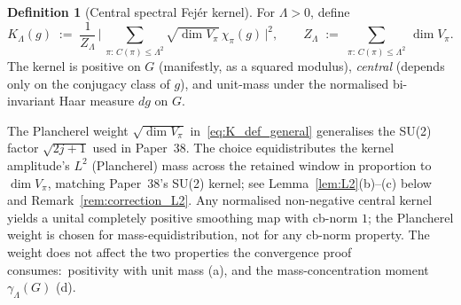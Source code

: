 \documentclass[11pt,a4paper]{article}
\theoremstyle{plain}
\theoremstyle{definition}
\newtheorem{definition}[theorem]{Definition}
\newcommand{\Lammax}{\Lambda}
\newcommand{\Cas}{C}
\newcommand{\KS}{K}
\begin{document}
\begin{definition}[Central spectral Fej\'er kernel]\label{def:central_fejer_general}
For $\Lammax > 0$, define
\begin{equation}\label{eq:K_def_general}
   \KS_\Lammax(g)
   \;:=\; \frac{1}{Z_\Lammax}\,
   \biggl|\,\sum_{\pi:\, \Cas(\pi) \le \Lammax^2}
   \sqrt{\dim V_\pi}\, \chi_\pi(g)\,\biggr|^{2},
   \qquad
   Z_\Lammax \;:=\; \sum_{\pi:\, \Cas(\pi) \le \Lammax^2}\,\dim V_\pi.
\end{equation}
The kernel is positive on $G$ (manifestly, as a squared modulus),
\emph{central} (depends only on the conjugacy class of $g$), and
unit-mass under the normalised bi-invariant Haar measure $dg$ on $G$.
\end{definition}

The Plancherel weight $\sqrt{\dim V_\pi}$ in~\eqref{eq:K_def_general}
generalises the SU(2) factor $\sqrt{2j+1}$ used in Paper~38. The
choice equidistributes the kernel amplitude's $L^2$ (Plancherel) mass
across the retained window in proportion to $\dim V_\pi$, matching
Paper~38's SU(2) kernel; see Lemma~\ref{lem:L2}(b)--(c) below and
Remark~\ref{rem:correction_L2}. Any normalised non-negative central
kernel yields a unital completely positive smoothing map with
cb-norm $1$; the Plancherel weight is chosen for mass-equidistribution,
not for any cb-norm property. The
weight does not affect the two properties the convergence proof
consumes:\ positivity with unit mass (a), and the mass-concentration
moment $\gamma_\Lammax(G)$ (d).
\end{document}
